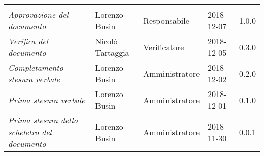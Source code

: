 \newpage 
\section*{}
\begin{table}[H]
	\centering
	\begin{tabular}{p{4cm}|C{3cm}|C{3cm}|R{2.5cm}|R{2cm}}
		
		 & & & & \\
		
		
		\emph{Approvazione del documento} & Lorenzo Busin & Responsabile & 2018-12-07 & 1.0.0 \\
		\hline
		
		\emph{Verifica del documento} & Nicolò Tartaggia & Verificatore & 2018-12-05 & 0.3.0 \\
		\hline

		\emph{Completamento stesura verbale} & Lorenzo Busin & Amministratore & 2018-12-02 & 0.2.0 \\
		\hline

		\emph{Prima stesura verbale} & Lorenzo Busin & Amministratore & 2018-12-01 & 0.1.0 \\
		\hline
		
		\emph{Prima stesura dello scheletro del documento} & Lorenzo Busin & Amministratore & 2018-11-30 & 0.0.1 \\
		
	\end{tabular}
	
\end{table}


\clearpage